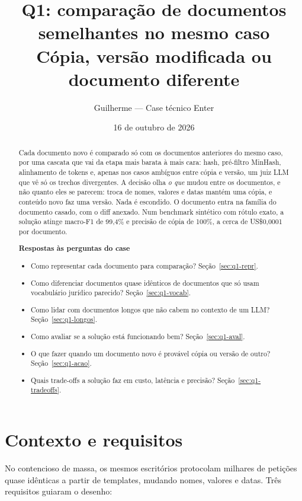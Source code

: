 \documentclass[11pt,a4paper]{article}
\title{Q1: comparação de documentos semelhantes no mesmo caso\\[4pt]
\large Cópia, versão modificada ou documento diferente}
\author{Guilherme --- Case técnico Enter}
\date{16 de outubro de 2026}
\begin{document}
\maketitle

\begin{abstract}
\noindent
Cada documento novo é comparado só com os documentos anteriores do mesmo caso, por uma cascata
que vai da etapa mais barata à mais cara: hash, pré-filtro MinHash, alinhamento de tokens e,
apenas nos casos ambíguos entre cópia e versão, um juiz LLM que vê só os trechos divergentes. A
decisão olha \emph{o que} mudou entre os documentos, e não quanto eles se parecem: troca de
nomes, valores e datas mantém uma cópia, e conteúdo novo faz uma versão. Nada é escondido. O
documento entra na família do documento casado, com o diff anexado. Num benchmark sintético com
rótulo exato, a solução atinge macro-F1 de 99,4\% e precisão de cópia de 100\%, a cerca de
US\$0,0001 por documento.

\medskip\noindent
\textbf{Respostas às perguntas do case}
\begin{itemize}
  \item Como representar cada documento para comparação? Seção~\ref{sec:q1-repr}.
  \item Como diferenciar documentos quase idênticos de documentos que só usam vocabulário
    jurídico parecido? Seção~\ref{sec:q1-vocab}.
  \item Como lidar com documentos longos que não cabem no contexto de um LLM?
    Seção~\ref{sec:q1-longos}.
  \item Como avaliar se a solução está funcionando bem? Seção~\ref{sec:q1-aval}.
  \item O que fazer quando um documento novo é provável cópia ou versão de outro?
    Seção~\ref{sec:q1-acao}.
  \item Quais trade-offs a solução faz em custo, latência e precisão?
    Seção~\ref{sec:q1-tradeoffs}.
\end{itemize}
\end{abstract}

\tableofcontents
\bigskip

\section{Contexto e requisitos}

No contencioso de massa, os mesmos escritórios protocolam milhares de petições quase idênticas a
partir de templates, mudando nomes, valores e datas. Três requisitos guiaram o desenho:
\end{document}
